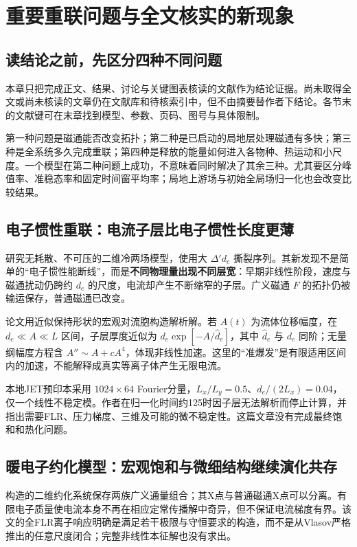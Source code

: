 \chapter{重要重联问题与全文核实的新现象}\label{ch:findings}
\section{读结论之前，先区分四种不同问题}
本章只把完成正文、结果、讨论与关键图表核读的文献作为结论证据。尚未取得全文或尚未核读的文章仍在文献库和待核索引中，但不由摘要替作者下结论。各节末的文献键可在末章找到模型、参数、页码、图号与具体限制。

第一种问题是磁通能否改变拓扑；第二种是已启动的局地层处理磁通有多快；第三种是全系统多久完成重联；第四种是释放的能量如何进入各物种、热运动和小尺度。一个模型在第二种问题上成功，不意味着同时解决了其余三种。尤其要区分峰值率、准稳态率和固定时间窗平均率；局地上游场与初始全局场归一化也会改变比较结果。

\section{电子惯性重联：电流子层比电子惯性长度更薄}
\citet{Ottaviani1993}研究无耗散、不可压的二维冷两场模型，使用大 $\Delta'd_e$ 撕裂序列。其新发现不是简单的“电子惯性能断线”，而是\textbf{不同物理量出现不同层宽}：早期非线性阶段，速度与磁通扰动仍跨约 $d_e$ 的尺度，电流却产生不断缩窄的子层。广义磁通 $F$ 的拓扑仍被输运保存，普通磁通已改变。

论文用近似保持形状的宏观对流胞构造解析解。若 $A(t)$ 为流体位移幅度，在 $d_e\ll A\ll L$ 区间，子层厚度近似为 $d_e\exp[-A/\widehat d_e]$，其中 $\widehat d_e$ 与 $d_e$ 同阶；无量纲幅度方程含 $A''\sim A+cA^4$，体现非线性加速。这里的“准爆发”是有限适用区间内的加速，不能解释成真实等离子体产生无限电流。

本地JET预印本采用 $1024\times64$ Fourier分量，$L_x/L_y=0.5$、$d_e/(2L_x)=0.04$，仅一个线性不稳定模。作者在归一化时间约125时因子层无法解析而停止计算，并指出需要FLR、压力梯度、三维及可能的微不稳定性。这篇文章没有完成最终饱和和热化问题。

\section{暖电子约化模型：宏观饱和与微细结构继续演化共存}
\citet{Schep1994}构造的二维约化系统保存两族广义通量组合；其X点与普通磁通X点可以分离。有限电子质量使电流本身不再在相应定常传播解中奇异，但不保证电流梯度有界。该文的全FLR离子响应明确是满足若干极限与守恒要求的构造，而不是从Vlasov严格推出的任意尺度闭合；完整非线性本征解也没有求出。

